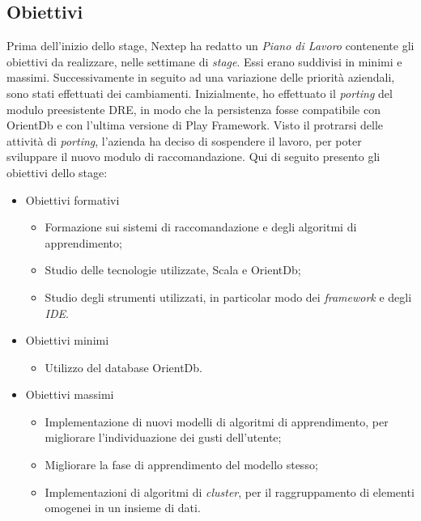 \subsection{Obiettivi}
Prima dell'inizio dello stage, Nextep ha redatto un \emph{Piano di Lavoro} contenente gli obiettivi da realizzare, nelle settimane di \emph{stage}. Essi erano suddivisi in minimi e massimi. Successivamente in seguito ad una variazione delle priorità aziendali, sono stati effettuati dei cambiamenti. Inizialmente, ho effettuato il \emph{porting} del modulo preesistente DRE, in modo che la persistenza fosse compatibile con OrientDb e con l'ultima versione di Play Framework. Visto il protrarsi delle attività di \emph{porting}, l'azienda ha deciso di sospendere il lavoro, per poter sviluppare il nuovo modulo di raccomandazione.
\newpage
Qui di seguito presento gli obiettivi dello stage:
\begin{itemize}
\item Obiettivi formativi
\begin{itemize}
\item Formazione sui sistemi di raccomandazione e degli algoritmi di apprendimento;
\item Studio delle tecnologie utilizzate, Scala e OrientDb;
\item Studio degli strumenti utilizzati, in particolar modo dei \emph{framework} e degli \emph{IDE}.
\end{itemize}
\item Obiettivi minimi
\begin{itemize}
\item Utilizzo del database OrientDb.
\end{itemize}
\item Obiettivi massimi
\begin{itemize}
\item Implementazione di nuovi modelli di algoritmi di apprendimento, per migliorare l'individuazione dei gusti dell'utente;
\item Migliorare la fase di apprendimento del modello stesso;
\item Implementazioni di algoritmi di \emph{cluster}, per il raggruppamento di elementi omogenei in un insieme di dati.
\end{itemize}
\end{itemize}




